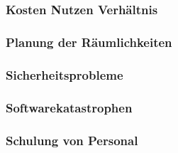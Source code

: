 \chapter{}
\label{sec:overview}

\subsection{Kosten Nutzen Verhältnis}
\subsection{Planung der Räumlichkeiten}
\subsection{Sicherheitsprobleme}
\subsection{Softwarekatastrophen}
\subsection{Schulung von Personal}